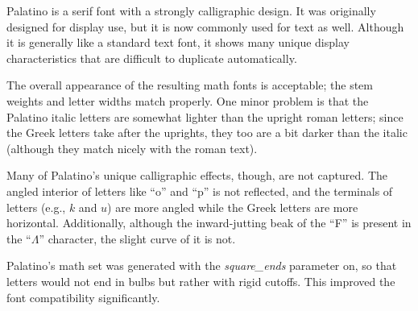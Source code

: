 
Palatino is a serif font with a strongly calligraphic design. It was originally
designed for display use, but it is now commonly used for text as well. Although
it is generally like a standard text font, it shows many unique display
characteristics that are difficult to duplicate automatically.

The overall appearance of the resulting math fonts is acceptable; the stem
weights and letter widths match properly. One minor problem is that the Palatino
italic letters are somewhat lighter than the upright roman letters; since the
Greek letters take after the uprights, they too are a bit darker than the italic
(although they match nicely with the roman text).

Many of Palatino's unique calligraphic effects, though, are not captured. The
angled interior of letters like ``o'' and ``p'' is not reflected, and the
terminals of letters (e.g., $k$ and $u$) are more angled while the Greek letters
are more horizontal. Additionally, although the inward-jutting beak of the ``F''
is present in the ``$\Lambda$'' character, the slight curve of it is not.

Palatino's math set was generated with the \emph{square\_ends} parameter on, so
that letters would not end in bulbs but rather with rigid cutoffs. This improved
the font compatibility significantly.
